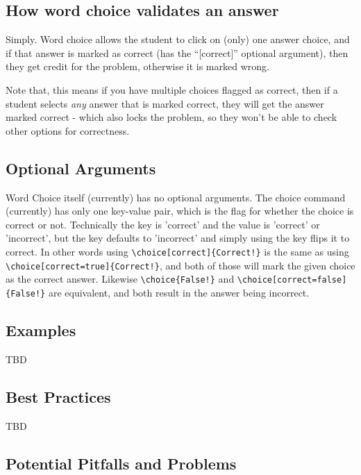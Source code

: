 \documentclass{ximera}
\begin{document}
    \subsection*{How word choice validates an answer}
    
        Simply. Word choice allows the student to click on (only) one answer choice, and if that answer is marked as correct (has the ``[correct]'' optional argument), then they get credit for the problem, otherwise it is marked wrong.
        
        Note that, this means if you have multiple choices flagged as correct, then if a student selects \textit{any} answer that is marked correct, they will get the answer marked correct - which also locks the problem, so they won't be able to check other options for correctness.

    \subsection*{Optional Arguments}
        
        Word Choice itself (currently) has no optional arguments. The choice command (currently) has only one key-value pair, which is the flag for whether the choice is correct or not. Technically the key is 'correct' and the value is 'correct' or 'incorrect', but the key defaults to 'incorrect' and simply using the key flips it to correct. In other words using \verb|\choice[correct]{Correct!}| is the same as using \verb|\choice[correct=true]{Correct!}|, and both of those will mark the given choice as the correct answer. Likewise \verb|\choice{False!}| and \verb|\choice[correct=false]{False!}| are equivalent, and both result in the answer being incorrect.

    \subsection*{Examples}
    
        TBD
        
    \subsection*{Best Practices}
    
        TBD
        

    \subsection*{Potential Pitfalls and Problems}
    
\end{document}
